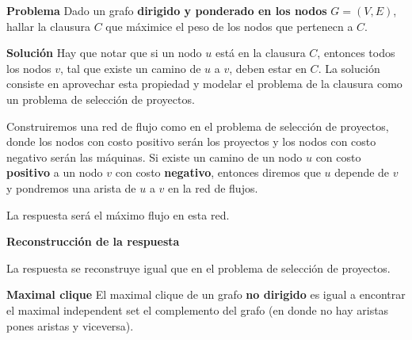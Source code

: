 {    \textbf{Problema}
    Dado un grafo \textbf{dirigido y ponderado en los nodos} $G=(V,E)$,
    hallar la clausura $C$ que máximice el peso de los nodos que pertenecn
    a $C$.

    \textbf{Solución}
    Hay que notar que si un nodo $u$ está en la clausura $C$, entonces todos
    los nodos $v$, tal que existe un camino de $u$ a $v$, deben estar en $C$.
    La solución consiste en aprovechar esta propiedad y modelar el problema
    de la clausura como un problema de selección de proyectos.

  Construiremos una red de flujo como en el problema de selección de proyectos,
  donde los nodos con costo positivo serán los proyectos y los nodos con costo
  negativo serán las máquinas. Si existe un camino de un nodo $u$ con costo
  \textbf{positivo} a un nodo $v$ con costo \textbf{negativo}, entonces diremos
  que $u$ depende de $v$ y pondremos una arista de $u$ a $v$ en la red de
  flujos.

  La respuesta será el máximo flujo en esta red.

  \textbf{Reconstrucción de la respuesta}

  La respuesta se reconstruye igual que en el problema de selección de
  proyectos.

  \textbf{Maximal clique} El maximal clique de un grafo \textbf{no dirigido}
  es igual a encontrar el maximal independent set el complemento del grafo (en
  donde no hay aristas pones aristas y viceversa).
}

